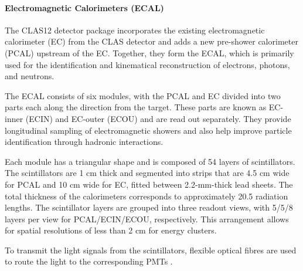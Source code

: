 \paragraph{Electromagnetic Calorimeters (ECAL)}
\label{par::ecal}
    The CLAS12 detector package incorporates the existing electromagnetic calorimeter (EC) from the CLAS detector and adds a new pre-shower calorimeter (PCAL) upstream of the EC.
    Together, they form the ECAL, which is primarily used for the identification and kinematical reconstruction of electrons, photons, and neutrons.

    The ECAL consists of six modules, with the PCAL and EC divided into two parts each along the direction from the target.
    These parts are known as EC-inner (ECIN) and EC-outer (ECOU) and are read out separately.
    They provide longitudinal sampling of electromagnetic showers and also help improve particle identification through hadronic interactions.

    Each module has a triangular shape and is composed of 54 layers of scintillators.
    The scintillators are 1 cm thick and segmented into strips that are 4.5 cm wide for PCAL and 10 cm wide for EC, fitted between 2.2-mm-thick lead sheets.
    The total thickness of the calorimeters corresponds to approximately 20.5 radiation lengths.
    The scintillator layers are grouped into three readout views, with 5/5/8 layers per view for PCAL/ECIN/ECOU, respectively.
    This arrangement allows for spatial resolutions of less than 2 cm for energy clusters.

    To transmit the light signals from the scintillators, flexible optical fibres are used to route the light to the corresponding PMTs \cite{asryan2020}.

